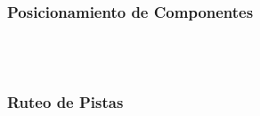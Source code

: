 \subsubsection{Posicionamiento de Componentes}

\lipsum[1]\\

\lipsum[2]\\

\subsubsection{Ruteo de Pistas}

\lipsum[3]\\

\lipsum[4]\\

\newpage\afterpage{\blankpage}

